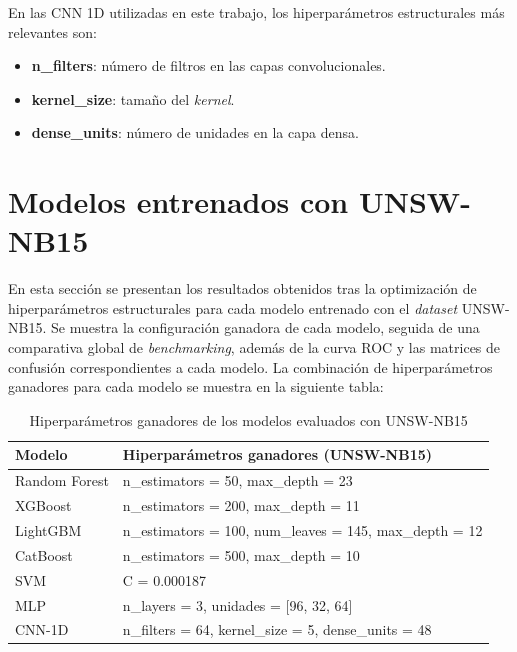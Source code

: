 En las CNN 1D utilizadas en este trabajo, los hiperparámetros estructurales más relevantes son:

\begin{itemize}
    \item \textbf{n\_filters}: número de filtros en las capas convolucionales.
    \item \textbf{kernel\_size}: tamaño del \textit{kernel}.
    \item \textbf{dense\_units}: número de unidades en la capa densa.
\end{itemize}



\section{Modelos entrenados con UNSW-NB15}

En esta sección se presentan los resultados obtenidos tras la optimización de hiperparámetros estructurales para cada modelo entrenado con el \textit{dataset} UNSW-NB15. Se muestra la configuración ganadora de cada modelo, seguida de una comparativa global de \textit{benchmarking}, además de la curva ROC y las matrices de confusión correspondientes a cada modelo.
La combinación de hiperparámetros ganadores para cada modelo se muestra en la siguiente tabla:

\begin{table}[H]
    \centering
    \small
    \begin{tabular}{|l|p{10cm}|}
        \hline
        \textbf{Modelo} & \textbf{Hiperparámetros ganadores (UNSW-NB15)} \\
        \hline
        Random Forest & n\_estimators = 50, max\_depth = 23 \\
        \hline
        XGBoost & n\_estimators = 200, max\_depth = 11 \\
        \hline
        LightGBM & n\_estimators = 100, num\_leaves = 145, max\_depth = 12 \\
        \hline
        CatBoost & n\_estimators = 500, max\_depth = 10 \\
        \hline
        SVM & C = 0.000187 \\
        \hline
        MLP & n\_layers = 3, unidades = [96, 32, 64] \\
        \hline
        CNN-1D & n\_filters = 64, kernel\_size = 5, dense\_units = 48 \\
        \hline
    \end{tabular}
    \caption{Hiperparámetros ganadores de los modelos evaluados con UNSW-NB15}
    \label{tab:unsw_best_hyperparams}
\end{table}
 
